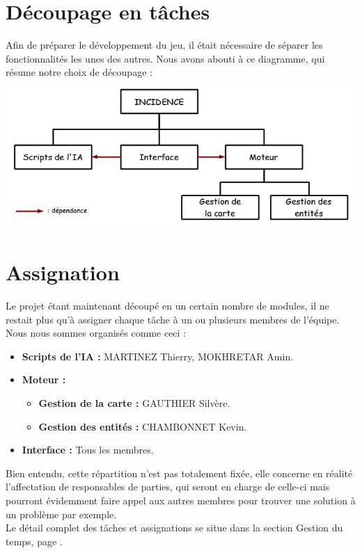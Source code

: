 \documentclass[a4paper]{article}
\newcommand{\alinea}{\hspace*{0.5cm}}
\begin{document}
    \section{Découpage en tâches}
      \alinea Afin de préparer le développement du jeu, il était nécessaire de séparer les fonctionnalités les unes des autres. Nous avons abouti à ce diagramme, qui résume notre choix de découpage :\\
      \includegraphics[scale=0.5]{img/DiagrammeDecoupageProjet.png}
      \label{DiagDecoupage}

    \section{Assignation}
      \alinea Le projet étant maintenant découpé en un certain nombre de modules, il ne restait plus qu'à assigner chaque tâche à un ou plusieurs membres de l'équipe. Nous nous sommes organisés comme ceci :
      \begin{itemize}
        \item \textbf{Scripts de l'IA :} MARTINEZ Thierry, MOKHRETAR Amin.
        \item \textbf{Moteur :}
        \begin{itemize}
          \item \textbf{Gestion de la carte :} GAUTHIER Silvère.
          \item \textbf{Gestion des entités :} CHAMBONNET Kevin.
        \end{itemize}
        \item \textbf{Interface :} Tous les membres.
      \end{itemize}
      \alinea Bien entendu, cette répartition n'est pas totalement fixée, elle concerne en réalité l'affectation de responsables de parties, qui seront en charge de celle-ci mais pourront évidemment faire appel aux autres membres pour trouver une solution à un problème par exemple.\\
      \alinea Le détail complet des tâches et assignations se situe dans la section Gestion du temps, page \pageref{GestionTps}.
\end{document}
